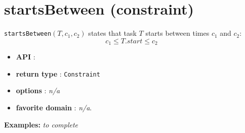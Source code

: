 \section{startsBetween (constraint)}\label{startsbetween:startsbetweenconstraint}\hypertarget{startsbetween:startsbetweenconstraint}{}
\begin{notedef}
  \texttt{startsBetween}$(T, c_1, c_2)$ states that task $T$ starts between times $c_1$ and $c_2$:
  $$c_1 \le T.start \le c_2$$
\end{notedef}

\begin{itemize}
	\item \textbf{API} :
	\item \textbf{return type} : \texttt{Constraint}
	\item \textbf{options} : \emph{n/a}
	\item \textbf{favorite domain} : \emph{n/a}.
\end{itemize}

\textbf{Examples:}
%
\emph{to complete}
